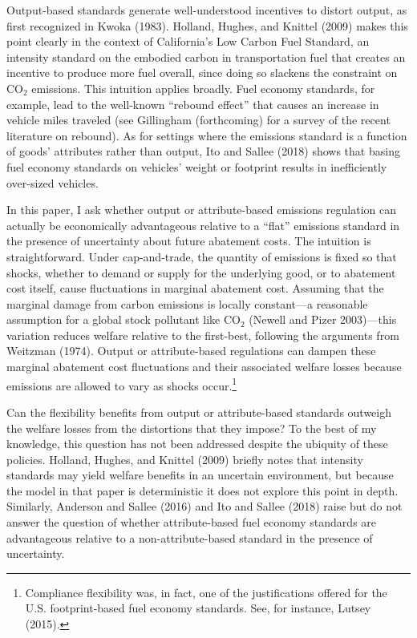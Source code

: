 \documentclass[12pt]{article}
\begin{document}
Output-based standards generate well-understood incentives to distort output, as first recognized in Kwoka (1983). Holland, Hughes, and Knittel (2009) makes this point clearly in the context of California's Low Carbon Fuel Standard, an intensity standard on the embodied carbon in transportation fuel that creates an incentive to produce more fuel overall, since doing so slackens the constraint on CO$_{\text{2}}$ emissions. This intuition applies broadly. Fuel economy standards, for example, lead to the well-known ``rebound effect'' that causes an increase in vehicle miles traveled (see Gillingham (forthcoming) for a survey of the recent literature on rebound). As for settings where the emissions standard is a function of goods' attributes rather than output, Ito and Sallee (2018) shows that basing fuel economy standards on vehicles' weight or footprint results in inefficiently over-sized vehicles.

In this paper, I ask whether output or attribute-based emissions regulation can actually be economically advantageous relative to a ``flat'' emissions standard in the presence of uncertainty about future abatement costs. The intuition is straightforward. Under cap-and-trade, the quantity of emissions is fixed so that shocks, whether to demand or supply for the underlying good, or to abatement cost itself, cause fluctuations in marginal abatement cost. Assuming that the marginal damage from carbon emissions is locally constant---a reasonable assumption for a global stock pollutant like CO$_{\text{2}}$ (Newell and Pizer 2003)---this variation reduces welfare relative to the first-best, following the arguments from Weitzman (1974). Output or attribute-based regulations can dampen these marginal abatement cost fluctuations and their associated welfare losses because emissions are allowed to vary as shocks occur.\footnote{Compliance flexibility was, in fact, one of the justifications offered for the U.S. footprint-based fuel economy standards. See, for instance, Lutsey (2015).}

Can the flexibility benefits from output or attribute-based standards outweigh the welfare losses from the distortions that they impose? To the best of my knowledge, this question has not been addressed despite the ubiquity of these policies. Holland, Hughes, and Knittel (2009) briefly notes that intensity standards may yield welfare benefits in an uncertain environment, but because the model in that paper is deterministic it does not explore this point in depth. Similarly, Anderson and Sallee (2016) and Ito and Sallee (2018) raise but do not answer the question of whether attribute-based fuel economy standards are advantageous relative to a non-attribute-based standard in the presence of uncertainty.
\end{document}
